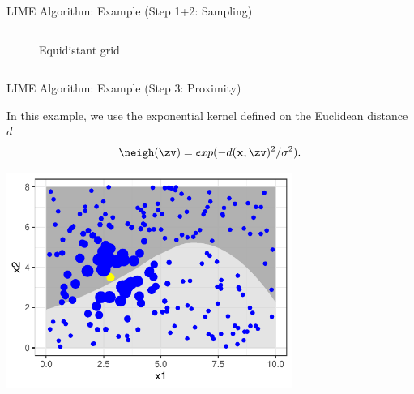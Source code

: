 \documentclass[10pt,compress,t,notes=noshow, xcolor=table]{beamer}
\begin{document}
\begin{frame}{LIME Algorithm: Example (Step 1+2: Sampling)}
\begin{columns}[totalwidth=\textwidth]
\begin{column}{0.5\textwidth}
\begin{figure}
			  \vspace{-0.3cm}
    		    \caption{Equidistant grid}
    		\end{figure}   
    \end{column}
\end{columns}
\end{frame}
		
\begin{frame}{LIME Algorithm: Example (Step 3: Proximity)}

	In this example, we use the exponential kernel defined on the Euclidean distance $d$
		 $$\neigh(\zv) = exp(-d(\xv, \zv)^2/\sigma^2).$$ 
		\begin{center}
			\includegraphics[width=0.7\textwidth]{figure/lime4}
		\end{center}
		
		
\end{frame}
		
\end{document}
